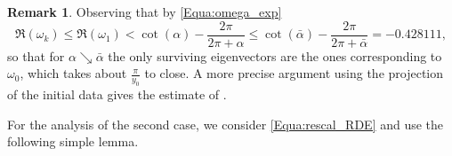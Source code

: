 \documentclass[reqno]{amsart}
\theoremstyle{definition} \newtheorem{definition}{Definition}[section]
\theoremstyle{definition} \newtheorem{remark}[definition]{Remark}
\theoremstyle{plain} \newtheorem{lemma}[definition]{Lemma}
\theoremstyle{plain} \newtheorem{proposition}[definition]{Proposition}
\theoremstyle{plain} \newtheorem{theorem}[definition]{Theorem}
\theoremstyle{plain} \newtheorem{corollary}[definition]{Corollary}
\theoremstyle{definition} \newtheorem{example}[definition]{Example}
\theoremstyle{plain} \newtheorem{claim}[clai]{Claim}
\theoremstyle{definition} \newtheorem{assumption}[definition]{Assumption}
\theoremstyle{definition} \newtheorem{observation}[definition]{Observation}
\newcommand{\1}{\mathbbm 1}
\numberwithin{equation}{section} %
\theoremstyle{plain} \newtheorem*{theorem*}{Theorem}
\theoremstyle{plain} \newtheorem{mthm}[maintheorem]{Main Theorem}
\theoremstyle{plain} \newtheorem*{mthm*}{Main Theorem}
\theoremstyle{plain} \newtheorem*{conjecture*}{Conjecture}
\theoremstyle{plain} \newtheorem{conjecture}[definition]{Conjecture}
\theoremstyle{plain} \newtheorem*{problem*}{Problem}
\begin{document}
\begin{remark}
\label{Rem:numer_rounds}
Observing that by \eqref{Equa:omega_exp}
\begin{equation*}
\Re(\omega_k) \leq \Re(\omega_1) < \cot(\alpha) - \frac{2\pi}{2\pi + \alpha} \leq \cot(\bar \alpha) - \frac{2\pi}{2\pi + \bar \alpha} = - 0.428111,
\end{equation*}
so that for $\alpha \searrow \bar \alpha$ the only surviving eigenvectors are the ones corresponding to $\omega_0$, which takes about $\frac{\pi}{y_0}$ to close. A more precise argument using the projection of the initial data gives the estimate of \cite[Theorem 4]{firefighter}.
\end{remark}

For the analysis of the second case, we consider \eqref{Equa:rescal_RDE} and use the following simple lemma.
\end{document}
